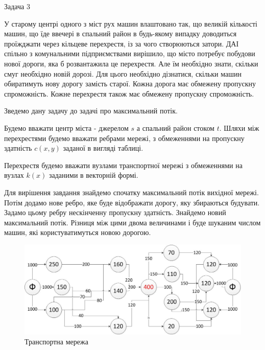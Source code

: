 \documentclass[a4paper,14pt,russian,ukrainian,oneside,final]{extreport}
\begin{document}
Задача 3

\indent
У старому центрі одного з міст рух машин влаштовано так, що великій кількості машин, що їде ввечері в спальний район в будь-якому випадку доводиться проїжджати через кільцеве перехрестя, із за чого створюються затори. ДАІ спільно з комунальними підприємствами вирішило, що місто потребує побудови нової дороги, яка б розвантажила це перехрестя. Але їм необхідно знати, скільки смуг необхідно новій дорозі. Для цього необхідно дізнатися, скільки машин обиратимуть нову дорогу замість старої. Кожна дорога має обмежену пропускну спроможність. Кожне перехрестя також має обмежену пропускну спроможність.

\indent
Зведемо дану задачу до задачі про максимальний потік.
\par Будемо вважати центр міста - джерелом $s$ а спальний район стоком $t$. Шляхи між перехрестями будемо вважати ребрами мережі, з обмеженнями на пропускну здатність $c(x,y)$ заданої в вигляді таблиці.
\par Перехрестя будемо вважати вузлами транспортної мережі з обмеженнями на вузлах $k(x)$ заданими в векторній формі.
\par Для вирішення завдання знайдемо спочатку максимальний потік вихідної мережі. Потім додамо нове ребро, яке буде відображати дорогу, яку збираються будувати. Задамо цьому ребру нескінченну пропускну здатність. Знайдемо новий максимальний потік. Різниця між цими двома величинами і буде шуканим числом машин, які користуватимуться новою дорогою.
\begin{figure}[h]
\begin{center}
\includegraphics[scale=0.6]{p3.jpg}
\caption{Транспортна мережа}
\end{center}
\end{figure}
\\
\end{document}
